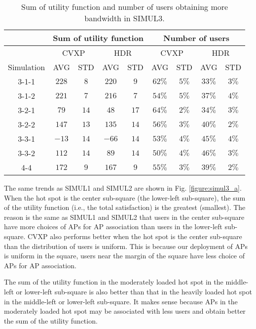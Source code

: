	\begin{table} \small
		\centering \caption{Sum of utility function and number of users obtaining more bandwidth in SIMUL3.}
		\renewcommand\arraystretch{1.0}
		\begin{tabular}{|c||c|c||c|c||c|c||c|c|} %
			\hline
			&\multicolumn{4}{|c||}{Sum of utility function} & \multicolumn {4}{|c|}{Number of users} \\
			\hline & \multicolumn{2}{|c||}{CVXP} & \multicolumn{2}{|c||}{HDR} & \multicolumn{2}{|c||}{CVXP} & \multicolumn{2}{|c|}{HDR} \\
			\hline	Simulation & AVG & STD & AVG & STD & AVG & STD & AVG & STD \\
			\hline
			\hline	3-1-1 & $228$ & $8$ & $220$ & $9$ & $62\%$ & $5\%$ & $33\%$ & $3\%$ \\
			\hline	3-1-2 & $221$ & $7$ & $216$ & $7$ & $54\%$ & $5\%$ & $37\%$ & $4\%$ \\
			\hline	3-2-1 & $79$ & $14$ & $48$ & $17$ & $64\%$ & $2\%$ & $34\%$ & $3\%$ \\
			\hline	3-2-2 & $147$ & $13$ & $135$ & $14$ & $56\%$ & $3\%$ & $40\%$ & $2\%$ \\
			\hline	3-3-1 & $-13$ & $14$ & $-66$ & $14$ & $53\%$ & $4\%$ & $45\%$ & $4\%$ \\
			\hline	3-3-2 & $112$ & $14$ & $89$ & $14$ & $50\%$ & $4\%$ & $46\%$ & $3\%$ \\
			\hline	4-4 & $172$ & $9$ & $167$ & $9$ & $55\%$ & $3\%$ & $39\%$ & $2\%$ \\
			\hline
		\end{tabular}\label{Tab:simul3}
	\end{table}	
	The same trends as SIMUL1 and SIMUL2 are shown in Fig. \ref{figure:simul3_a}. When the hot spot is the center sub-square (the lower-left sub-square), the sum of the utility function (i.e., the total satisfaction) is the greatest (smallest). The reason is the same as SIMUL1 and SIMUL2 that users in the center sub-square have more choices of APs for AP association than users in the lower-left sub-square. CVXP also performs better when the hot spot is the center sub-square than the distribution of users is uniform. This is because our deployment of APs is uniform in the square, users near the margin of the square have less choice of APs for AP association.
	
	The sum of the utility function in the moderately loaded hot spot in the middle-left or lower-left sub-square is also better than that in the heavily loaded hot spot in the middle-left or lower-left sub-square. It makes sense because APs in the moderately loaded hot spot may be associated with less users and obtain better the sum of the utility function.
	
